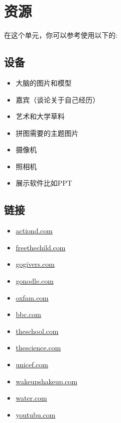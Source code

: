 \chapter{资源}  
  在这个单元，你可以参考使用以下的:\par
  
\section{设备}

  \begin{itemize}
    \item 大脑的图片和模型
    \item 嘉宾（谈论关于自己经历）
    \item 艺术和大学草料 
    \item 拼图需要的主题图片 
    \item 摄像机
    \item 照相机
    \item 展示软件比如PPT  
  \end{itemize}

\section{链接}
    \begin{itemize}
      \item \href{http://www.actionaid.org/what-we-do/education}{actiond.com}
      \item \href{http://www.freethechildren.com/}{freethechild.com}      
      \item \href{http://www.gogivers.org/}{gogivers.com} 
      \item \href{http://www.gonoodle.com/}{gonodle.com}
      \item \href{http://www.oxfam.org.uk/education/global-citizenship}{oxfam.com}
      \item \href{http://www.bbc.co.uk/scotland/brainsmart/brain/}{bbc.com} 
      \item \href{http://www.theschoolrun.com/homework-help/the-human-brain-and-nervous- system}{theschool.com} 
      \item \href{http://www.sciencemuseum.org.uk/whoami/?ndoutmore/yourbrain.aspx}{thescience.com}
      \item \href{http://www.unicef.org/}{unicef.com}  
      \item \href{http://www.wakeupshakeup.com/}{wakeupshakeup.com}   
      \item \href{http://www.wateraid.org/}{water.com}
      \item \href{http://www.youtube.com/watch?v=O5ChXC-rHLE}{youtubu.com}  
    \end{itemize}  
